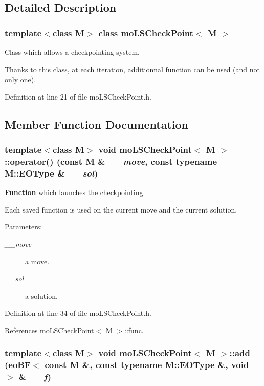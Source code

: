 \subsection{Detailed Description}
\subsubsection*{template$<$class M$>$ class moLSCheckPoint$<$ M $>$}

Class which allows a checkpointing system. 

Thanks to this class, at each iteration, additionnal function can be used (and not only one). 



Definition at line 21 of file moLSCheckPoint.h.

\subsection{Member Function Documentation}
\subsubsection{\setlength{\rightskip}{0pt plus 5cm}template$<$class M$>$ void {\bf moLSCheckPoint}$<$ M $>$::operator() (const M \& {\em \_\-\_\-move}, const typename M::EOType \& {\em \_\-\_\-sol})\hspace{0.3cm}{\tt  [inline]}}\label{classmo_l_s_check_point_2f9c1250279e3f49ec77a66c10029f1e}


{\bf Function} which launches the checkpointing. 

Each saved function is used on the current move and the current solution.

\begin{Desc}
\item[Parameters:]
\begin{description}
\item[{\em \_\-\_\-move}]a move. \item[{\em \_\-\_\-sol}]a solution. \end{description}
\end{Desc}


Definition at line 34 of file moLSCheckPoint.h.

References moLSCheckPoint$<$ M $>$::func.
\subsubsection{\setlength{\rightskip}{0pt plus 5cm}template$<$class M$>$ void {\bf moLSCheckPoint}$<$ M $>$::add ({\bf eoBF}$<$ const M \&, const typename M::EOType \&, void $>$ \& {\em \_\-\_\-f})\hspace{0.3cm}{\tt  [inline]}}\label{classmo_l_s_check_point_66be5fe2944bcdd752f1e58105e969a6}


